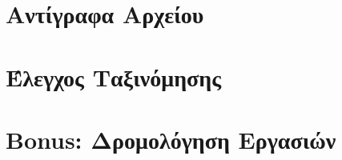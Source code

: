 \documentclass[a4paper,11pt]{book}
\begin{document}
\section{Αντίγραφα Αρχείου}


\vspace{3cm}

\section{Έλεγχος Ταξινόμησης}


\vspace{3cm}

\section{Bonus: Δρομολόγηση Εργασιών}

\end{document}
